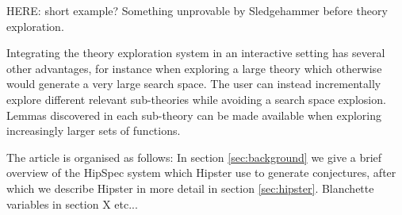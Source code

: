 HERE: short example? Something unprovable by Sledgehammer before theory exploration.


% 
Integrating the theory exploration system in an interactive setting has several other advantages, for instance when exploring a large theory which otherwise would generate a very large search space. The user can instead incrementally explore different relevant sub-theories while avoiding a search space explosion. Lemmas discovered in each sub-theory can be made available when exploring increasingly larger sets of functions. 

The article is organised as follows: In section \ref{sec:background} we give a brief overview of the HipSpec system which Hipster use to generate conjectures, after which we describe Hipster in more detail in section \ref{sec:hipster}. Blanchette variables in section X etc...
